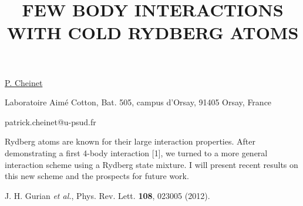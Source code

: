 \title{FEW BODY INTERACTIONS WITH COLD RYDBERG ATOMS}

\underline{P. Cheinet} 

{\normalsize{\vspace{-4mm}
Laboratoire Aim\'e Cotton,
Bat. 505, campus d'Orsay,
91405 Orsay,
France

\email patrick.cheinet@u-psud.fr}}

Rydberg atoms are known for their large interaction properties. After demonstrating a first 4-body interaction [1], we turned to a more general interaction scheme using a Rydberg state mixture. I will present recent results on this new scheme and the prospects for future work.

{\normalsize
J. H. Gurian \textit{et al.}, Phys. Rev. Lett. \textbf{108}, 023005 (2012).
}

\vspace{\baselineskip}
